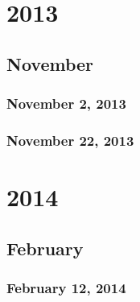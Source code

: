 \part{2013}
\chapter{November}
\section{November 2, 2013}


\section{November 22, 2013}

\part{2014}
\chapter{February}
\section{February 12, 2014}

